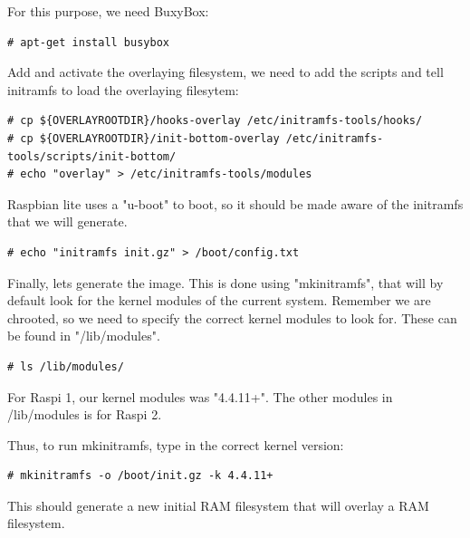 For this purpose, we need BuxyBox:

\begin{lstlisting}[]
# apt-get install busybox
\end{lstlisting}
\FloatBarrier
\vspace{-5mm}

Add and activate the overlaying filesystem, we need to add the scripts and tell initramfs
to load the overlaying filesytem:

\begin{lstlisting}[]
# cp ${OVERLAYROOTDIR}/hooks-overlay /etc/initramfs-tools/hooks/
# cp ${OVERLAYROOTDIR}/init-bottom-overlay /etc/initramfs-tools/scripts/init-bottom/
# echo "overlay" > /etc/initramfs-tools/modules
\end{lstlisting}
\FloatBarrier
\vspace{-5mm}

Raspbian lite uses a "u-boot" to boot, so it should be made aware of the
initramfs that we will generate.

\begin{lstlisting}[]
# echo "initramfs init.gz" > /boot/config.txt
\end{lstlisting}
\FloatBarrier
\vspace{-5mm}

Finally, lets generate the image. This is done using "mkinitramfs", that will
by default look for the kernel modules of the current system. Remember we are
chrooted, so we need to specify the correct kernel modules to look for. These
can be found in "/lib/modules".

\begin{lstlisting}[]
# ls /lib/modules/
\end{lstlisting}
\FloatBarrier
\vspace{-5mm}

For \ac{Raspi} 1, our kernel modules was "4.4.11+". The other modules in /lib/modules
is for \ac{Raspi} 2.

Thus, to run mkinitramfs, type in the correct kernel version:

\begin{lstlisting}[]
# mkinitramfs -o /boot/init.gz -k 4.4.11+
\end{lstlisting}
\FloatBarrier
\vspace{-5mm}

This should generate a new initial \ac{RAM} filesystem that will overlay a \ac{RAM} filesystem.


